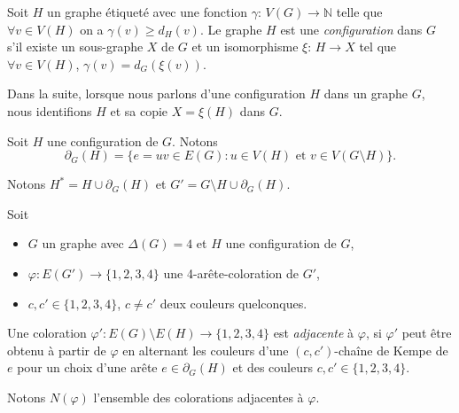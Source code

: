 \documentclass{beamer}
\begin{document}
\begin{frame}
Soit $H$ un graphe étiqueté avec une fonction $\gamma$: $V(G) \to \mathbb{N}$ telle que $\forall v \in V(H)$ on a $\gamma(v) \geq d_H(v)$. Le graphe $H$ est une \emph{configuration} dans $G$ s'il existe un sous-graphe $X$ de $G$ et un isomorphisme $\xi$: $H \to X$ tel que $\forall v \in V(H)$, $\gamma(v) = d_G(\xi(v))$. 

\pause


Dans la suite, lorsque nous parlons d'une configuration $H$ dans un graphe $G$, nous identifions $H$ et sa copie $X=\xi(H)$ dans $G$.
\end{frame}

\begin{frame}
Soit $H$ une configuration de $G$. Notons
$$
\partial_G(H) = \{e =uv \in E(G) : u \in V(H)\textrm{ et }v \in V(G \setminus H)\}.
$$ 

\pause


Notons $H^* = H \cup \partial_G(H)$ et $G'=G\setminus H \cup \partial_G(H)$.
\end{frame}


\begin{frame}
Soit 
\begin{itemize}
\item $G$ un graphe avec $\Delta(G)=4$ et $H$ une configuration de $G$,
\item $\varphi:E(G')\to \{1,2,3,4\}$ une 4-arête-coloration de $G'$,
\item $c, c' \in \{1,2,3,4\}$, $c\ne c'$ deux couleurs quelconques. 
\end{itemize}

Une coloration $\varphi':E(G)\setminus E(H)\to \{1,2,3,4\}$ est \emph{adjacente} à $\varphi$, si $\varphi'$ peut être obtenu à partir de $\varphi$ en alternant les couleurs d'une $(c,c')$-chaîne de Kempe de $e$ pour un choix d'une arête $e\in\partial_G(H)$ et des couleurs $c,c'\in\{1,2,3,4\}$. 



Notons $N(\varphi)$ l'ensemble des colorations adjacentes à $\varphi$.
\end{frame}
\end{document}
